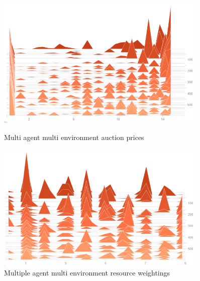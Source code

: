 \begin{figure}
    \centering
    \begin{minipage}{0.45\textwidth}
        \centering
        \includegraphics[width=0.9\textwidth]{figures/env_training_fig/multi_agents_multi_envs_auction_prices.png}
        \caption{Multi agent multi environment auction prices}
        \label{fig:multi_agent_multi_env_auction_prices}
    \end{minipage}\hfill
    \begin{minipage}{0.45\textwidth}
        \centering
        \includegraphics[width=0.9\textwidth]{figures/env_training_fig/multi_agents_multi_envs_weightings.png}
        \caption{Multiple agent multi environment resource weightings}
        \label{fig:multi_agent_multi_env_weightings}
    \end{minipage}
\end{figure}

